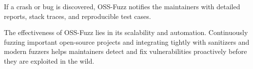 If a crash or bug is discovered, OSS-Fuzz notifies the maintainers with detailed reports, stack traces, and reproducible test cases.

The effectiveness of OSS-Fuzz lies in its scalability and automation. 
Continuously fuzzing important open-source projects and integrating tightly with sanitizers and modern fuzzers helps maintainers detect and fix vulnerabilities proactively before they are exploited in the wild. 
